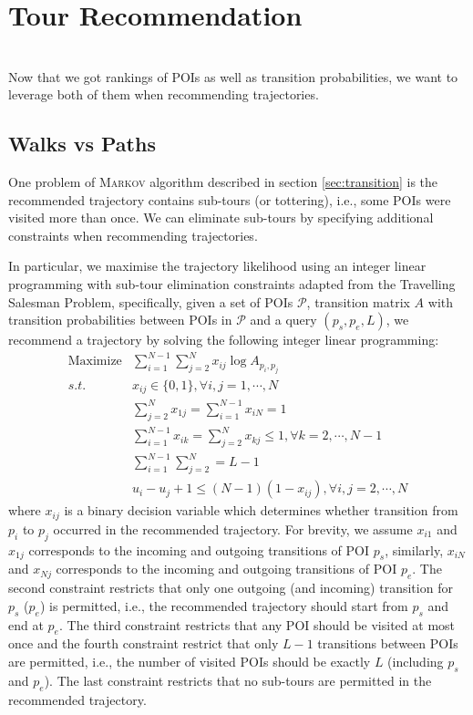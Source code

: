 \section{Tour Recommendation}
\label{sec:recommendation}

 \\
Now that we got rankings of POIs as well as transition probabilities,
we want to leverage both of them when recommending trajectories.

\subsection{Walks vs Paths}
\label{walkpath}
%
One problem of \textsc{Markov} algorithm described in section \ref{sec:transition}
is the recommended
trajectory contains sub-tours (or tottering), i.e., some POIs were visited more than once.
We can eliminate sub-tours by specifying additional constraints when recommending trajectories.

In particular, we maximise the trajectory likelihood using an integer linear programming with
sub-tour elimination constraints adapted from the Travelling Salesman Problem\cite{opt98},
specifically, given a set of POIs $\mathcal{P}$, transition matrix $A$ with transition probabilities
between POIs in $\mathcal{P}$ and a query $(p_s, p_e, L)$,
we recommend a trajectory by solving the following integer linear programming:
\begin{align*}
\text{Maximize} & \sum_{i=1}^{N-1} \sum_{j=2}^N x_{ij} \log A_{p_i, p_j} \\
s.t. & x_{ij} \in \{0, 1\}, \forall i, j = 1, \cdots, N \\
     & \sum_{j=2}^N x_{1j} = \sum_{i=1}^{N-1} x_{iN} = 1 \\
     & \sum_{i=1}^{N-1} x_{ik} = \sum_{j=2}^N x_{kj} \le 1, \forall k=2, \cdots, N-1 \\
     & \sum_{i=1}^{N-1} \sum_{j=2}^N = L-1 \\
     & u_i - u_j + 1 \le (N-1) (1-x_{ij}), \forall i, j = 2, \cdots, N
\end{align*}
where $x_{ij}$ is a binary decision variable which determines whether transition from $p_i$ to $p_j$
occurred in the recommended trajectory.
For brevity, we assume $x_{i1}$ and $x_{1j}$ corresponds to the incoming and outgoing transitions of POI $p_s$,
similarly, $x_{iN}$ and $x_{Nj}$ corresponds to the incoming and outgoing transitions of POI $p_e$.
The second constraint restricts that only one outgoing (and incoming) transition for $p_s$ ($p_e$)
is permitted, i.e., the recommended trajectory should start from $p_s$ and end at $p_e$.
The third constraint restricts that any POI should be visited at most once and the fourth constraint
restrict that only $L-1$ transitions between POIs are permitted, i.e., the number of visited POIs should be
exactly $L$ (including $p_s$ and $p_e$).
The last constraint restricts that no sub-tours are permitted in the recommended trajectory.

